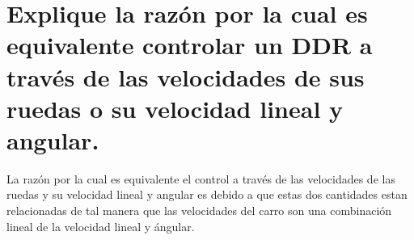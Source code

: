 \section{Explique la razón por la cual es equivalente controlar un DDR a través de las velocidades de sus ruedas o su velocidad lineal y angular.}
La razón por la cual es equivalente el control a través de las velocidades de las ruedas y su velocidad lineal y angular es debido a que estas dos cantidades estan relacionadas de tal manera que las velocidades del carro son una combinación lineal de la velocidad lineal y ángular.